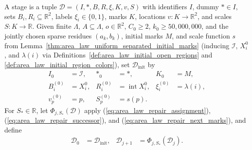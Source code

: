 \begin{definition}
    \label{def:area_law_repair_stage}
    \leanok
    A stage is a tuple $\mathcal D=(I,*,B,R,\xi,K,v,S)$ with identifiers $I$, dummy $*\in I$,
    sets $B_i,R_i\subseteq\mathbb R^2$, labels $\xi_i\in\{0,1\}$, marks $K$, locations $v:K\to\mathbb R^2$,
    and scales $S:K\to\mathbb R$. Given finite $\Lambda$, $A\subseteq\Lambda$, $o\in\mathbb R^2$,
    $C_0\ge2$, $k_0\ge50{,}000{,}000$, and the jointly chosen sparse residues $(a_k,b_k)$, initial
    marks $M$, and scale function $s$ from Lemma~\ref{thm:area_law_uniform_separated_initial_marks}
    (inducing $\mathcal I$, $X_i^0$, and $\lambda(i)$ via
    Definitions~\ref{def:area_law_initial_open_regions} and \ref{def:area_law_initial_region_colors}),
    set $\mathcal D_{\mathrm{init}}$ by
    \begin{align}
        I_0       & =\mathcal I,
                  & *_0          & =*,
                  & K_0          & =M,                       \\
        B_i^{(0)} & =X_i^0,
                  & R_i^{(0)}    & =\operatorname{int}X_i^0,
                  & \xi_i^{(0)}  & =\lambda(i),              \\
        v_p^{(0)} & =p,
                  & S_p^{(0)}    & =s(p).
        \label{eq:area_law_repair_initial}
    \end{align}
    For $S_*\in\mathbb R$, let $\Phi_{j,S_*}(\mathcal D)$ apply (\ref{eq:area_law_repair_assignment}),
    (\ref{eq:area_law_repair_successor}), and (\ref{eq:area_law_repair_next_marks}), and define
    \begin{align}
        \mathcal D_0 & =\mathcal D_{\mathrm{init}},
                     & \mathcal D_{j+1}             & =\Phi_{j,S_*}(\mathcal D_j).
        \label{eq:area_law_repair_iteration}
    \end{align}
\end{definition}

